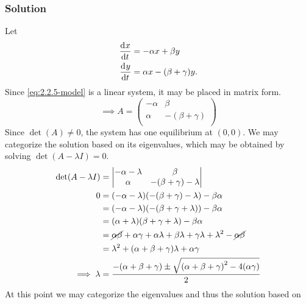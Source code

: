 \documentclass[12pt]{article}
\begin{document}
\subsubsection*{Solution}
Let
\begin{equation}
  \label{eq:2.2.5-model}
  \begin{aligned}
    \frac{\mathrm{d}^{} {x}}{\mathrm{d}{t}^{}} &= -\alpha x + \beta y \\
    \frac{\mathrm{d}^{} {y}}{\mathrm{d}{t}^{}} &= \alpha x - (\beta + \gamma)y. \\
  \end{aligned}
\end{equation}
Since \cref{eq:2.2.5-model} is a linear system, it may be placed in matrix form.
\begin{equation*}
  \implies A = \begin{pmatrix}
    -\alpha & \beta \\ \alpha & -(\beta+\gamma) \\
  \end{pmatrix}
\end{equation*}
Since $\det(A) \ne 0$, the system has one equilibrium at $(0,0)$. We may
categorize the solution based on its eigenvalues, which may be obtained by
solving $\det(A-\lambda I)=0$.
\begin{equation}
  \label{eq:2.2.5-eigenvalue-equation}
  \begin{aligned}
    \det(A-\lambda I) &=
    \begin{vmatrix}
      -\alpha-\lambda & \beta \\ \alpha & -(\beta+\gamma)-\lambda \\
    \end{vmatrix} \\
    0 &= (-\alpha-\lambda)(-(\beta+\gamma)-\lambda) - \beta\alpha \\
    &= (-\alpha-\lambda)(-(\beta+\gamma+\lambda)) - \beta\alpha \\
    &= (\alpha+\lambda)(\beta+\gamma+\lambda) - \beta\alpha \\
    &= \cancel{\alpha\beta} + \alpha\gamma + \alpha\lambda + \beta\lambda +
    \gamma\lambda + \lambda^2 - \cancel{\alpha\beta} \\
    &= \lambda^2 + (\alpha+\beta+\gamma)\lambda + \alpha\gamma \\
    \implies \lambda &= \frac{-(\alpha+\beta+\gamma)\pm\sqrt{{(\alpha+\beta+\gamma)}^2-4(\alpha\gamma)}}{2} \\
  \end{aligned}
\end{equation}
At this point we may categorize the eigenvalues and thus the solution based on
\end{document}
